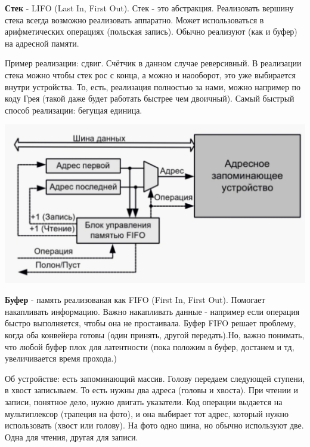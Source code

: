 \documentclass[a4paper,12pt]{article}
\begin{document}
	\noindent \textbf{Стек} - LIFO (Last In, First Out). Стек - это абстракция. Реализовать вершину стека всегда возможно реализовать аппаратно. Может использоваться в арифметических операциях (польская запись). Обычно реализуют (как и буфер) на адресной памяти. \newline
	
	\noindent Пример реализации: сдвиг. Счётчик в данном случае реверсивный. В реализации стека можно 
	чтобы стек рос с конца, а можно и наооборот, это уже выбирается внутри устройства. То, есть, реализация полностью за нами, можно например по коду Грея (такой даже будет работать быстрее чем двоичный). Самый быстрый способ реализации: бегущая единица.
	
	\begin{center}
		\noindent \includegraphics[scale=0.4]{2.png}\newline
	\end{center}

	\noindent \textbf{Буфер} - память реализованая как FIFO (First In, First Out). Помогает накапливать информацию. Важно накапливать данные - например если операция быстро выполняется, чтобы она не простаивала. Буфер FIFO решает проблему, когда оба конвейера готовы (один принять, другой передать).Но, важно понимать, что любой буфер плох для латентности (пока положим в буфер, достанем и тд, увеличивается время прохода.)\newline
	
	\noindent Об устройстве: есть запоминающий массив. Голову передаем следующей ступени, в хвост записываем. То есть нужны два адреса (головы и хвоста). При чтении и записи, понятное дело, нужно двигать указатели. Код операции выдается на мультиплексор (трапеция на фото), и она выбирает тот адрес, который нужно использовать (хвост или голову). На фото одно шина, но обычно используют две. Одна для чтения, другая для записи.
	
\end{document}

